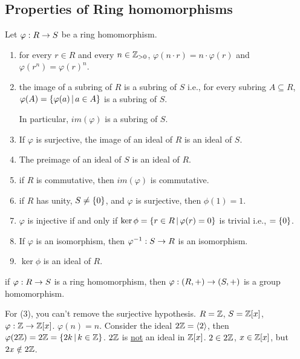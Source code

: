 \documentclass[]{article}
\begin{document}
\subsection{Properties of Ring homomorphisms}

Let $\varphi:R\rightarrow S$ be a ring homomorphism.
\begin{enumerate}
	\item for every $r\in R$ and every $n\in\mathbb{Z}_{>0}$, $\varphi(n\cdot r)=n\cdot\varphi(r)$ and $\varphi(r^n)=\varphi(r)^n$.
	\item the image of a subring of $R$ is a subring of $S$ i.e., for every subring $A\subseteq R$, $\varphi(A)=\left\{ \varphi(a) \, \middle| \, a\in A \right\}$ is a subring of $S$.
		\begin{note}
			In particular, $im(\varphi)$ is a subring of $S$.
		\end{note}
	\item If $\varphi$ is surjective, the image of an ideal of $R$ is an ideal of $S$.
	\item The preimage of an ideal of $S$ is an ideal of $R$.
	\item if $R$ is commutative, then $im(\varphi)$ is commutative.
	\item if $R$ has unity, $S\neq\left\{ 0 \right\}$, and $\varphi$ is surjective, then $\phi(1)=1$.
	\item $\varphi$ is injective if and only if $\ker\phi=\left\{ r\in R \, \middle| \, \varphi(r)=0 \right\}$ is trivial i.e., $=\left\{ 0 \right\}$.
	\item If $\varphi$ is an isomorphism, then $\varphi^{-1}:S\rightarrow R$ is an isomorphism.
	\item $\ker\phi$ is an ideal of $R$.
\end{enumerate}
\begin{remark}
	if $\varphi:R\rightarrow S$ is a ring homomorphism, then $\varphi:(R,+)\rightarrow(S,+)$ is a group homomorphism.
\end{remark}
For (3), you can't remove the surjective hypothesis.
$R = \mathbb{Z}$, $S=\mathbb{Z}[x]$, $\varphi:\mathbb{Z}\rightarrow\mathbb{Z}[x]$.
$\varphi(n)=n$. Consider the ideal $2\mathbb{Z}=\left\langle 2 \right\rangle$, then $\varphi(2\mathbb{Z})=2\mathbb{Z}=\left\{ 2k \, \middle| \, k\in\mathbb{Z} \right\}$.
$2\mathbb{Z}$ is \ul{not} an ideal in $\mathbb{Z}[x]$. $2\in2\mathbb{Z}$, $x\in\mathbb{Z}[x]$, but $2x\notin2\mathbb{Z}$.
\end{document}
